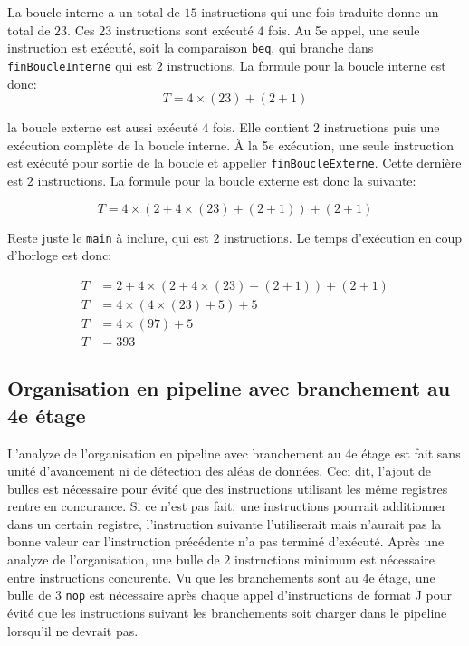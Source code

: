 \documentclass[a11paper]{article}
\newcommand{\todo}[1]{\begin{color}{Red}\textbf{TODO:} #1\end{color}}
\begin{document}
La boucle interne a un total de $15$ instructions qui une fois traduite donne
un total de $23$. Ces 23 instructions sont exécuté $4$ fois. Au 5e appel, une
seule instruction est exécuté, soit la comparaison \verb|beq|, qui branche
dans \verb|finBoucleInterne| qui est $2$ instructions. La formule pour la
boucle interne est donc: $$ T = 4\times(23)+(2+1) $$

la boucle externe est aussi exécuté $4$ fois. Elle contient $2$ instructions
puis une exécution complète de la boucle interne. À la 5e exécution, une
seule instruction est exécuté pour sortie de la boucle et appeller
\verb|finBoucleExterne|. Cette dernière est $2$ instructions. La formule pour
la boucle externe est donc la suivante:

\begin{equation}
T = 4\times(2+4\times(23)+(2+1)) + (2+1)
\end{equation}

Reste juste le \verb|main| à inclure, qui est $2$ instructions. Le temps
d'exécution en coup d'horloge est donc:

\begin{align}
  T &= 2+ 4\times(2+4\times(23)+(2+1)) + (2+1) \\
  T &= 4\times(4\times(23)+5) + 5 \\
  T &= 4\times(97) + 5 \\
  T &= 393
\end{align}

\subsection{Organisation en pipeline avec branchement au 4e étage}


L'analyze de l'organisation en pipeline avec branchement au 4e étage est fait
sans unité d'avancement ni de détection des aléas de données. Ceci dit,
l'ajout de bulles est nécessaire pour évité que des instructions utilisant
les même registres rentre en concurance. Si ce n'est pas fait, une
instructions pourrait additionner dans un certain registre, l'instruction
suivante l'utiliserait mais n'aurait pas la bonne valeur car l'instruction
précédente n'a pas terminé d'exécuté. Après une analyze de l'organisation,
une bulle de $2$ instructions minimum est nécessaire entre instructions
concurente. Vu que les branchements sont au 4e étage, une bulle de $3$
\verb|nop| est nécessaire après chaque appel d'instructions de format J pour
évité que les instructions suivant les branchements soit charger dans le
pipeline lorsqu'il ne devrait pas.
\end{document}
